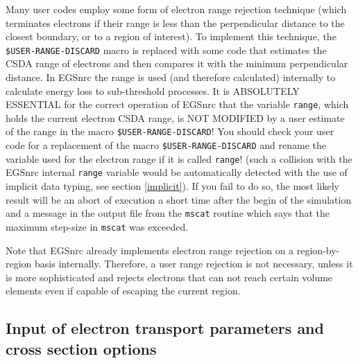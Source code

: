 Many user codes employ some form of electron range rejection technique
(which terminates electrons if their range is
less than the perpendicular distance to the closest boundary,
or to a region of interest).
To implement this technique, the
{\tt \$USER-RANGE-DISCARD} macro is replaced
with some code that estimates the CSDA range of electrons
and then compares it with the minimum perpendicular distance.
In EGSnrc the range is used (and therefore calculated) internally
to calculate energy loss to sub-threshold processes.
It is ABSOLUTELY ESSENTIAL for the correct operation of EGSnrc that
the variable {\tt range}, which holds the current electron CSDA
range, is NOT MODIFIED by a user estimate of the range in
the macro {\tt \$USER-RANGE-DISCARD}! You should
check your user code for a replacement of the macro
{\tt \$USER-RANGE-DISCARD} and rename the variable
used for the electron range if it is called {\tt range}!
(such a collision with the EGSnrc internal {\tt range}
variable would be automatically detected with the use
of implicit data typing, see section \ref{implicit}). If you fail
to do so, the most likely result will be an abort
of execution a short time after the begin of the simulation
and a message in the output file from the {\tt mscat} routine
which says that the maximum step-size in {\tt mscat} was exceeded.

Note that EGSnrc already implements electron range rejection
on a region-by-region basis internally. Therefore,
a user range rejection is not necessary, unless
it is more sophisticated and rejects electrons
that can not reach certain volume elements even if capable of
escaping the current region.

\subsection{Input of electron transport parameters
and cross section options}
\label{parameter_input}

